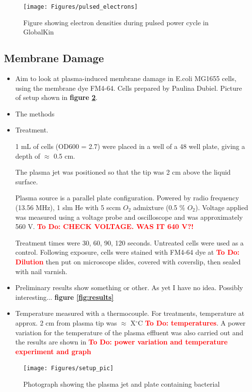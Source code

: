 \documentclass[11pt, oneside]{article}   	%
\newcommand{\todo}[1]{ \textcolor{red}{\bf{To Do:} #1}}
\begin{document}
\begin{figure}
\centering
\texttt{[image: Figures/pulsed\_electrons]}
\caption{Figure showing electron densities during pulsed power cycle in GlobalKin}
\label{fig:pulsed_electrons}
\end{figure}

\subsection{Membrane Damage}

\begin{itemize}
\item Aim to look at plasma-induced membrane damage in E.coli MG1655 cells, using the membrane dye FM4-64. Cells prepared by Paulina Dubiel. Picture of setup shown in \textbf{figure \ref{fig:setup_pic}}.
\item The methods
\item Treatment. 

1 mL of cells (OD600 = 2.7) were placed in a well of a 48 well plate, giving a depth of $\approx$ 0.5 cm. 

The plasma jet was positioned so that the tip was 2 cm above the liquid surface. 

Plasma source is a parallel plate configuration. Powered by radio frequency (13.56 MHz), 1 slm He with 5 sccm $O_2$ admixture (0.5 \% $O_2$). Voltage applied was measured using a voltage probe and oscilloscope and was approximately 560 V. \todo{CHECK VOLTAGE. WAS IT 640 V?!}

Treatment times were 30, 60, 90, 120 seconds. Untreated cells were used as a control. Following exposure, cells were stained with FM4-64 dye at \todo{Dilution} then put on microscope slides, covered with coverslip, then sealed with nail varnish.

\item Preliminary results show something or other. As yet I have no idea. Possibly interesting... \textbf{figure \ref{fig:results}}

\item Temperature measured with a thermocouple. For treatments, temperature at approx. 2 cm from plasma tip was $\approx$ X$^\circ$C \todo{temperatures}.
A power variation for the temperature of the plasma effluent was also carried out and the results are shown in \todo{power variation and temperature experiment and graph}
\end{itemize}

\begin{figure}
\centering
\texttt{[image: Figures/setup\_pic]}
\caption{Photograph showing the plasma jet and plate containing bacterial}
\label{fig:setup_pic}
\end{figure}
\end{document}
